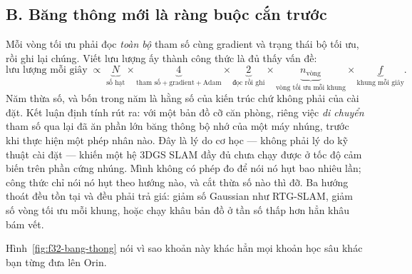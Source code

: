 \documentclass[../../deep_learning.tex]{subfiles}
\begin{document}
\subsection{B. Băng thông mới là ràng buộc cắn trước}
Mỗi vòng tối ưu phải đọc \emph{toàn bộ} tham số cùng gradient và trạng thái bộ tối ưu, rồi ghi lại chúng. Viết lưu lượng ấy thành công thức là đủ thấy vấn đề:
\[
\text{lưu lượng mỗi giây} \;\propto\;
\underbrace{N}_{\text{số hạt}} \times
\underbrace{4}_{\text{tham số}+\text{gradient}+\text{Adam}} \times
\underbrace{2}_{\text{đọc rồi ghi}} \times
\underbrace{n_{\text{vòng}}}_{\text{vòng tối ưu mỗi khung}} \times
\underbrace{f}_{\text{khung mỗi giây}} .
\]
Năm thừa số, và bốn trong năm là hằng số của kiến trúc chứ không phải của cài đặt. Kết luận định tính rút ra: với một bản đồ cỡ căn phòng, riêng việc \emph{di chuyển} tham số qua lại đã ăn phần lớn băng thông bộ nhớ của một máy nhúng, trước khi thực hiện một phép nhân nào. Đây là lý do cơ học --- không phải lý do kỹ thuật cài đặt --- khiến một hệ 3DGS SLAM đầy đủ chưa chạy được ở tốc độ cảm biến trên phần cứng nhúng. Mình không có phép đo để nói nó hụt bao nhiêu lần; công thức chỉ nói nó hụt theo hướng nào, và cắt thừa số nào thì đỡ. Ba hướng thoát đều tồn tại và đều phải trả giá: giảm số Gaussian như RTG-SLAM, giảm số vòng tối ưu mỗi khung, hoặc chạy khâu bản đồ ở tần số thấp hơn hẳn khâu bám vết.

Hình~\ref{fig:f32-bang-thong} nói vì sao khoản này khác hẳn mọi khoản học sâu khác bạn từng đưa lên Orin.
\end{document}
